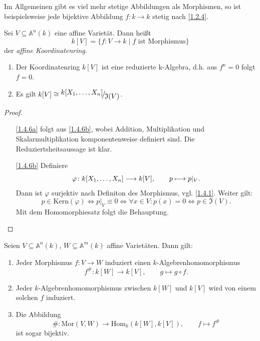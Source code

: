 \documentclass[a4paper,12pt]{scrbook}
\newtheorem{proof}{Beweis}
\def\A{\mathbb{A}}
\def\I{\mathfrak{I}}
\newcommand{\Hom}{\mathrm{Hom}}
\newcommand{\Mor}{\mathrm{Mor}}
\newcommand{\Kern}{\mathrm{Kern}}
\newcommand{\ra}{\longrightarrow}
\renewcommand{\phi}{\varphi}
\renewcommand{\mapsto}{\longmapsto}
\newcommand{\Quotient}[2]{
  \raisebox{0.7ex}{\ensuremath{#1}}
  \ensuremath{\mkern-3mu}\big/\ensuremath{\mkern-3mu}
  \raisebox{-0.6ex}{\ensuremath{#2}}}
\newcommand{\polyx}[1][n]{\ensuremath%
  [X_{1},\dotsc,X_{#1}]}
\begin{document}
\begin{w}
Im Allgemeinen gibt es viel mehr stetige Abbildungen als Morphismen, so ist beispielsweise jede bijektive Abbildung $f\colon k\ra k$ stetig nach \cref{1.2.4}.
\end{w}

\begin{dfn}\label{1.4.5}
Sei $V\subseteq \A^n(k)$ eine affine Varietät. Dann heißt 
\[k[V]=\{f\colon V\ra k \mid f\text{ ist Morphismus\}}\]
 der \emph{affine Koordinatenring}.
\end{dfn}

\begin{bem}
\begin{enumerate}
\item{} Der Koordinatenring $k[V]$ ist eine reduzierte k-Algebra, d.h. aus $f^n=0$ folgt $f=0$.
\item{} Es gilt $k[V] \cong \Quotient{k\polyx}{\I(V)}$.
\end{enumerate}
\end{bem}

\begin{proof}
\begin{enumerate}
\item[\ref{1.4.6a}] folgt aus \ref{1.4.6b}, wobei Addition, Multiplikation und Skalarmultiplikation komponentenweise definiert sind. Die Reduziertsheitsaussage ist klar.
\item[\ref{1.4.6b}] Definiere
\[\phi\colon  k\polyx\ra k[V],  \qquad p\mapsto p|_V.\]
Dann ist $\phi$ surjektiv nach Definiton des Morphismus, vgl. \cref{1.4.1}. Weiter gilt:
\[p \in \Kern(\phi) \iff p|_V \equiv 0 \iff \forall x\in V: p(x)=0 \iff p\in \I(V).\] 
Mit dem Homomorphiesatz folgt die Behauptung. 
\end{enumerate}
\end{proof}

\begin{bem}\label{1.4.7} Seien $V\subseteq \A^n(k)$, $W\subseteq \A^m(k)$ affine Varietäten. Dann gilt:
\begin{enumerate}
\item Jeder Morphismus $f\colon V\ra W$ induziert einen $k$-Algebrenhomomorphismus
\[f^{\#}\colon  k[W]\ra k[V], \qquad g\mapsto g\circ f.\]
\item Jeder $k$-Algebrenhomomorphismus zwischen $k[W]$ und $k[V]$ wird von einem solchen $f$ induziert.
\item Die Abbildung 
\[\#\colon \Mor(V,W)\ra \Hom_k(k[W],k[V]), \qquad f\mapsto f^{\#}\]
ist sogar bijektiv.
\end{enumerate}
\end{bem}
\end{document}
